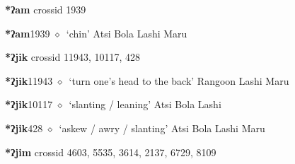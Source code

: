 \item
\textbf{*ʔam}
  {\tiny crossid 1939}
  \begin{list}{}{\leftmargin=1.5em \itemindent=-1.5em}
  \item {\footnotesize \textbf{*ʔam}}{\tiny 1939}
         $\diamond$~`chin'
         Atsi 
\hspace{1ex}
         Bola 
\hspace{1ex}
         Lashi 
\hspace{1ex}
         Maru 
  \end{list}
\item
\textbf{*ʔjik}
  {\tiny crossid 11943, 10117, 428}
  \begin{list}{}{\leftmargin=1.5em \itemindent=-1.5em}
  \item {\footnotesize \textbf{*ʔjik}}{\tiny 11943}
         $\diamond$~`turn one's head to the back'
         Rangoon 
\hspace{1ex}
         Lashi 
\hspace{1ex}
         Maru 
  \item {\footnotesize \textbf{*ʔjik}}{\tiny 10117}
\hspace{1ex}
         $\diamond$~`slanting / leaning'
         Atsi 
\hspace{1ex}
         Bola 
\hspace{1ex}
         Lashi 
  \item {\footnotesize \textbf{*ʔjik}}{\tiny 428}
\hspace{1ex}
         $\diamond$~`askew / awry / slanting'
         Atsi 
\hspace{1ex}
         Bola 
\hspace{1ex}
         Lashi 
\hspace{1ex}
         Maru 
  \end{list}
\item
\textbf{*ʔjim}
  {\tiny crossid 4603, 5535, 3614, 2137, 6729, 8109}
